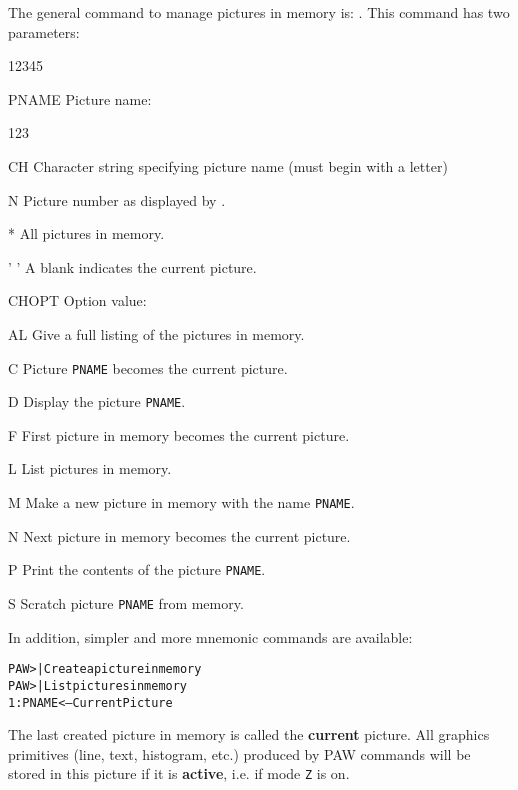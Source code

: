 The general command to manage pictures in memory is: .
This command has two parameters:
\begin{DLtt}{12345}
  \item[PNAME] Picture name:
    \begin{DLtt}{123}
      \item[CH]  Character string specifying picture name (must begin with a letter)
      \item[N]   Picture number as displayed by .
      \item[*]   All pictures in memory.
      \item[' '] A blank indicates the current picture.
    \end{DLtt}
  \item[CHOPT] Option value:
    \begin{DLtt}{12}
      \item[AL] Give a full listing of the pictures in memory.
      \item[C]  Picture \texttt{PNAME} becomes the current picture.
      \item[D]  Display the picture \texttt{PNAME}.
      \item[F]  First picture in memory becomes the current picture.
      \item[L]  List pictures in memory.
      \item[M]  Make a new picture in memory with the name \texttt{PNAME}.
      \item[N]  Next picture in memory becomes the current picture.
      \item[P]  Print the contents of the picture \texttt{PNAME}.
      \item[S]  Scratch picture \texttt{PNAME} from memory.
    \end{DLtt}
\end{DLtt}

In addition, simpler and more mnemonic commands are available:

\begin{alltt}
PAW >            | Create a picture in memory
PAW >                    | List pictures in memory
 1: PNAME <-- Current Picture
\end{alltt}

The last created picture in memory is called the {\bf current} picture. 
All graphics
primitives (line, text, histogram, etc.) produced by PAW commands will be stored
in this picture if it is {\bf active}, i.e. if mode \texttt{Z} is on.

